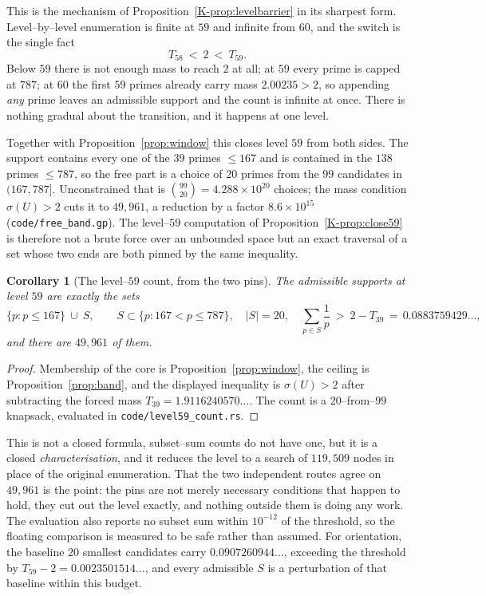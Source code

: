 \documentclass[11pt]{article}
\newtheorem{corollary}[theorem]{Corollary}
\theoremstyle{definition}
\begin{document}
This is the mechanism of Proposition~\ref{K-prop:levelbarrier} in its sharpest form. Level--by--level
enumeration is finite at $59$ and infinite from $60$, and the switch is the single fact
\[ T_{58}\ <\ 2\ <\ T_{59}. \]
Below $59$ there is not enough mass to reach $2$ at all; at $59$ every prime is capped at $787$; at
$60$ the first $59$ primes already carry mass $2.00235>2$, so appending \emph{any} prime leaves an
admissible support and the count is infinite at once. There is nothing gradual about the transition,
and it happens at one level.

Together with Proposition~\ref{prop:window} this closes level $59$ from both sides. The support
contains every one of the $39$ primes $\le167$ and is contained in the $138$ primes $\le787$, so the
free part is a choice of $20$ primes from the $99$ candidates in $(167,787]$. Unconstrained that is
$\binom{99}{20}=4.288\times10^{20}$ choices; the mass condition $\sigma(U)>2$ cuts it to $49{,}961$,
a reduction by a factor $8.6\times10^{15}$ \textup{(\texttt{code/free\_band.gp})}. The level--$59$
computation of Proposition~\ref{K-prop:close59} is therefore not a brute force over an unbounded space
but an exact traversal of a set whose two ends are both pinned by the same inequality.

\begin{corollary}[The level--$59$ count, from the two pins]\label{cor:count59}
The admissible supports at level $59$ are exactly the sets
\[ \{p:p\le167\}\ \cup\ S, \qquad S\subset\{p:167<p\le787\},\quad |S|=20,\quad
   \sum_{p\in S}\frac1p\ >\ 2-T_{39}\,=\,0.0883759429\ldots, \]
and there are $49{,}961$ of them.
\end{corollary}
\begin{proof}
Membership of the core is Proposition~\ref{prop:window}, the ceiling is Proposition~\ref{prop:band},
and the displayed inequality is $\sigma(U)>2$ after subtracting the forced mass
$T_{39}=1.9116240570\ldots$. The count is a $20$--from--$99$ knapsack, evaluated in
\texttt{code/level59\_count.rs}.
\end{proof}

This is not a closed formula, subset--sum counts do not have one, but it is a closed
\emph{characterisation}, and it reduces the level to a search of $119{,}509$ nodes in place of the
original enumeration. That the two independent routes agree on $49{,}961$ is the point: the pins are
not merely necessary conditions that happen to hold, they cut out the level exactly, and nothing
outside them is doing any work. The evaluation also reports no subset sum within $10^{-12}$ of the
threshold, so the floating comparison is measured to be safe rather than assumed. For orientation,
the baseline $20$ smallest candidates carry $0.0907260944\ldots$, exceeding the threshold by
$T_{59}-2=0.0023501514\ldots$, and every admissible $S$ is a perturbation of that baseline within
this budget.
\end{document}
